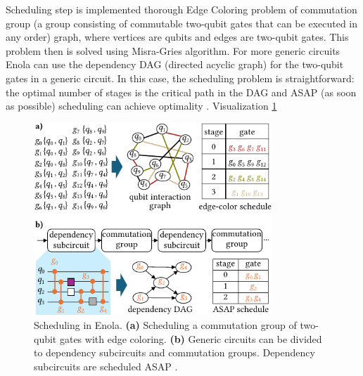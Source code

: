 Scheduling step is implemented thorough Edge Coloring problem of commutation group (a group consisting of commutable two-qubit
gates that can be executed in any order) graph, 
where vertices are qubits and edges are two-qubit gates. 
This problem then is solved using Misra-Gries algorithm.
For more generic circuits Enola can use the dependency DAG (directed acyclic graph) for the two-qubit
gates in a generic circuit. In this case, the scheduling problem is
straightforward: the optimal number of stages is the critical path
in the DAG and ASAP (as soon as possible) scheduling can achieve
optimality \parencite{Tan_2025_Enola}. Visualization \ref{fig:scheduling_Enola}
\begin{figure}[htbp]
  \centering
    \includegraphics[width=0.8\textwidth]{figures/scheduling_Enola.pdf}
    \caption [Scheduling in Enola]{ Scheduling in Enola. 
    \textbf{(a)} Scheduling a commutation group of two-qubit gates with edge coloring. 
    \textbf{(b)} Generic circuits can be divided to dependency subcircuits and commutation groups. 
    Dependency subcircuits are scheduled ASAP \parencite{Tan_2025_Enola}.}
    \label{fig:scheduling_Enola}
\end{figure}

